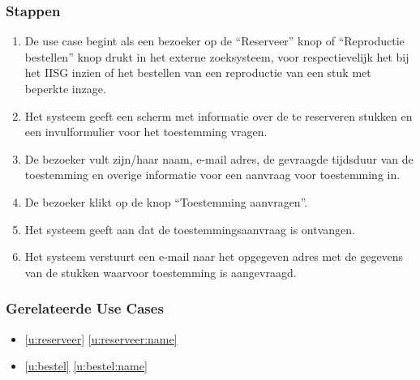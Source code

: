 \documentclass[a4paper,titlepage]{report}
\def\namedref#1{\ref{#1} \ref{#1:name}}
\begin{document}
      \subsubsection{Stappen}
        \begin{enumerate}
          \item De use case begint als een bezoeker op de ``Reserveer'' knop
            of ``Reproductie bestellen'' knop drukt in het externe
            zoeksysteem, voor respectievelijk het bij het IISG inzien of het
            bestellen van een reproductie van een stuk met beperkte inzage.
          \item Het systeem geeft een scherm met informatie over de te
            reserveren stukken en een invulformulier voor het toestemming
            vragen.
          \item De bezoeker vult zijn/haar naam, e-mail adres, de gevraagde
          tijdsduur van de toestemming en overige informatie voor een
          aanvraag voor toestemming in.
          \item De bezoeker klikt op de knop ``Toestemming aanvragen''.
          \item Het systeem geeft aan dat de toestemmingsaanvraag is ontvangen.
          \item Het systeem verstuurt een e-mail naar het opgegeven adres met
            de gegevens van de stukken waarvoor toestemming is aangevraagd.
        \end{enumerate}

      \subsubsection{Gerelateerde Use Cases}
        \begin{itemize}
          \item \namedref{u:reserveer}
          \item \namedref{u:bestel}
        \end{itemize}
\end{document}
